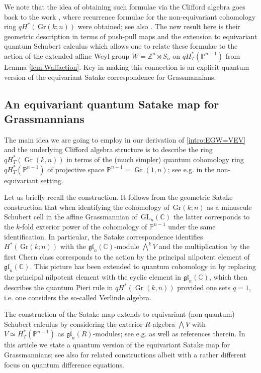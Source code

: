 \documentclass[12pt]{amsart}
\newcommand{\Z}{\mathbb{Z}}
\newcommand{\C}{\mathbb{C}}
\newcommand{\GL}{\,\mathrm{GL}}
\newcommand{\Gr}{\,\mathrm{Gr}}
\newcommand{\mb}[1]{\mathbb{#1}}
\newcommand{\op}[1]{\operatorname{#1}}
\newcommand{\ring}{R}
\numberwithin{equation}{section}
\numberwithin{figure}{section}
\newcommand{\gl}{\mathfrak{gl}}
\begin{document}
We note that the idea of obtaining such formulae via the Clifford algebra goes back to the work \cite[Section 11]{korffstroppel2010}, where recurrence formulae for the non-equivariant cohomology ring $qH^*(\Gr(k;n))$ were obtained; see also \cite{Korff09}. The new result here is their geometric description in terms of push-pull maps and the extension to equivariant quantum Schubert calculus which allows one to relate these formulae to the action of the extended affine Weyl group $W=\Z^n\rtimes S_n$ on $qH^*_T(\mb{P}^{n-1})$ from Lemma \ref{lem:Waffaction}. Key in making this connection is an explicit quantum version of the equivariant Satake correspondence for Grassmannians.

\subsection{An equivariant quantum Satake map for Grassmannians}
The main idea we are going to employ in our derivation of \eqref{intro:EGW=VEV} and the underlying Clifford algebra structure is to describe the ring $qH_T^*(\op{Gr}(k,n))$ in terms of the (much simpler) quantum cohomology ring $qH_T^*(\mb{P}^{n-1})$ of projective space $\mb{P}^{n-1}=\op{Gr}(1,n)$; see e.g. \cite{hori2000mirror,bertram2005two,kim2008quantum,golyshev2011quantum} in the non-equivariant setting. 

Let us briefly recall the construction. It follows from the geometric Satake construction  \cite{ginzburg1995perverse,mirkovic2007geometric} that when identifying the cohomology of $\Gr(k;n)$ as a minuscule Schubert cell in the affine Grassmannian of $\GL_n(\C)$ the latter corresponds to the $k$-fold exterior power of the cohomology of $\mb{P}^{n-1}$ under the same identification. In particular, the Satake correspondence identifies $H^*(\Gr(k;n))$ with the $\gl_n(\C)$-module $\bigwedge^kV$ and the multiplication by the first Chern class corresponds to the action by the principal nilpotent element of $\gl_n(\C)$. This picture has been extended to quantum cohomology in \cite{ciocan2008abelian,golyshev2011quantum} by replacing the principal nilpotent element with the cyclic element in $\gl_n(\mb{C})$, which then describes the quantum Pieri rule in $qH^*(\op{Gr}(k,n))$ provided one sets $q=1$, i.e. one considers the so-called Verlinde algebra.

The construction of the Satake map extends to equivariant (non-quantum) Schubert calculus by considering the exterior $\ring$-algebra $\bigwedge V$ with $V\simeq H^*_T(\mb{P}^{n-1})$ as $\gl_n(\ring)$-modules; see e.g. \cite{martin2000symplectic,Laksov09,anderson2023equivariant,labelle2024equivariant} as well as references therein. In this article we state a quantum version of the equivariant Satake map for Grassmannians; see also \cite{cotti2025satake,cheng2025quantum} for related constructions albeit with a rather different focus on quantum difference equations. 
\end{document}

